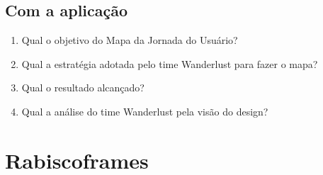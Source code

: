 \documentclass{article}
\begin{document}
\subsection{Com a aplicação}


\begin{enumerate}
      \item Qual o objetivo do Mapa da Jornada do Usuário?



      \item Qual a estratégia adotada pelo time Wanderlust para fazer o mapa?



      \item Qual o resultado alcançado?



      \item Qual a análise do time Wanderlust pela visão do design?



\end{enumerate}

\section{Rabiscoframes}
\end{document}

